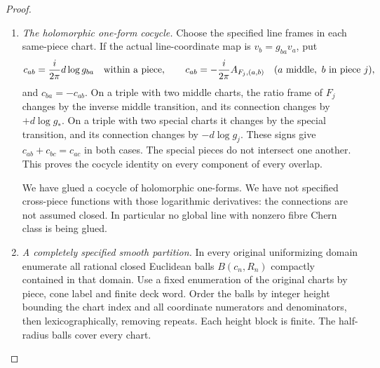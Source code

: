 \begin{proof}
\begin{enumerate}[label=\arabic*.,leftmargin=*]
For the remaining finite cyclic descent its actual line multiplier is
\[
 k_F=\frac{e^{2\pi i\,12F_j(\zeta+\sigma)}}{k_j(s,\zeta)}.
\]
Let $k_F^{(r)}$ be the product over the first $r$ actual affine
iterates.  The finite sum
\begin{equation}\label{inv:eq:atlas-averaged-connection}
 A^{\rm inv}=\frac1{m_j}\sum_{r=0}^{m_j-1}
       \bigl((g_j^r)^*A+d\log k_F^{(r)}\bigr)
\end{equation}
is a connection on the same line.  The exact power relation in
\eqref{inv:eq:atlas-affine-lift} makes cyclic permutation of the
summands valid, so it descends to the original annulus.  For
$F_j=L_j\otimes L_*^{-1}$ use the dual connection $-A^{\rm inv}$.
This is the tensor-dual map, including its sign; no line factors are
discarded.  These holomorphic connections need not be flat:
$da$ can supply a $(2,0)$ curvature term.

\item \emph{The holomorphic one-form cocycle.}
Choose the specified line frames in each same-piece chart.  If
the actual line-coordinate map is $v_b=g_{ba}v_a$, put
\begin{equation}\label{inv:eq:atlas-cocycle}
 c_{ab}=\frac{i}{2\pi}d\log g_{ba}\quad\hbox{within a piece},
 \qquad
 c_{ab}=-\frac{i}{2\pi}A_{F_j,(a,b)}\quad
       (a\text{ middle},\ b\text{ in piece }j),
\end{equation}
and $c_{ba}=-c_{ab}$.
On a triple with two middle charts, the ratio frame of $F_j$
changes by the inverse middle transition, and its connection changes
by $+d\log g_*$.  On a triple with two special charts it changes
by the special transition, and its connection changes by
$-d\log g_j$.  These signs give
$c_{ab}+c_{bc}=c_{ac}$ in both cases.  The special pieces do not
intersect one another.  This proves the cocycle identity on every
component of every overlap.

We have glued a cocycle of holomorphic one-forms.  We have not
specified cross-piece functions with those logarithmic derivatives:
the connections are not assumed closed.  In particular no global
line with nonzero fibre Chern class is being glued.

\item \emph{A completely specified smooth partition.}
In every original uniformizing domain enumerate all rational closed
Euclidean balls $B(c_n,R_n)$ compactly contained in that domain.
Use a fixed enumeration of the original charts by piece, cone label
and finite deck word.  Order the balls by integer height bounding
the chart index and all coordinate numerators and denominators,
then lexicographically, removing repeats.  Each height block is
finite.  The half-radius balls cover every chart.


\end{enumerate}
\end{proof}
